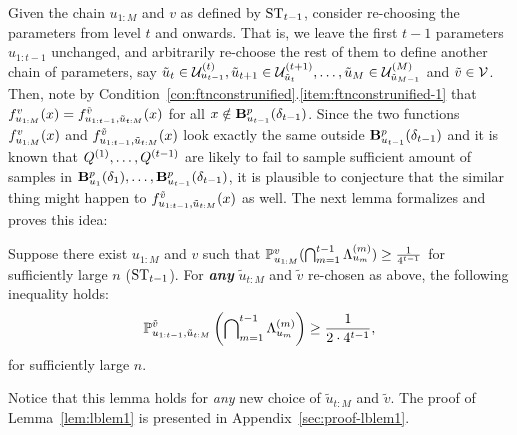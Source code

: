 Given the chain $u_{1:M}$ and $v$ as defined by $\stmt_{t-1}$,
consider re-choosing the parameters from level $t$ and onwards.
That is, we leave the first $t-1$ parameters $u_{1:t-1}$ unchanged, and arbitrarily
re-choose the rest of them to define another chain of parameters,
say $\tilde u_t \in \Utemp{t-1}{t}, \tilde u_{t+1} \in \mathcal{U} _{\tilde u_t}^{(t+1)}, \dots, \tilde u_{M} \in \mathcal{U} _{\tilde u_{M-1}}^{(M)}$ and $\tilde v \in \V$.
Then, note by Condition~\ref{con:ftnconstrunified}.\ref{item:ftnconstrunified-1} that 
$\ftnuv(x) = \ftnuvtildet(x)$ for all $x \notin \Bptmone$.
Since the two functions $\ftnuv(x)$ and $\ftnuvtildet(x)$ look exactly the same outside $\Bptmone$
and it is known that $\Qone, \dots, \Qtmone$ are likely to 
fail to sample sufficient amount of samples in $\Bpone, \dots, \Bptmone$,
it is plausible to conjecture that the similar thing might happen to $\ftnuvtildet(x)$ as well.
The next lemma formalizes and proves this idea:
\begin{lemma}
	\label{lem:lblem1}
	Suppose there exist $u_{1:M}$ and $v$ 
	such that $\probuv (\bigcap_{m=1}^{t-1} \EvSmSplm ) \geq \frac{1}{4^{t-1}}$ for sufficiently large $n$ ($\stmt_{t-1}$).
	For \textbf{\emph{any}} $\tilde u_{t:M}$ and $\tilde v$ re-chosen as above, the following inequality holds: 
	\begin{equation}
	\label{eqn:lblem1induc}
	\probuvtildet \left (\bigcap\nolimits_{m=1}^{t-1} \EvSmSplm \right ) 
	\geq \frac{1}{2 \cdot 4^{t-1}},
	\end{equation}
	for sufficiently large $n$.
\end{lemma}
Notice that this lemma holds for \emph{any} new choice of $\tilde u_{t:M}$ and $\tilde v$.
The proof of Lemma~\ref{lem:lblem1} is presented in Appendix~\ref{sec:proof-lblem1}.

